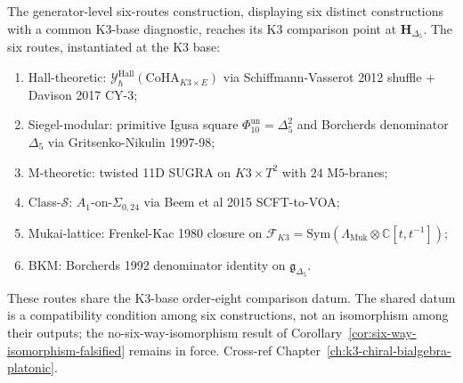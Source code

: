 \begin{remark}
\label{rem:cyc-sixroutes-generator-synthesis}
The generator-level six-routes construction, displaying six
distinct constructions with a common K3-base diagnostic, reaches
its K3 comparison point at $\mathbf H_{\Delta_5}$. The six routes,
instantiated at the K3 base:
\begin{enumerate}
\item Hall-theoretic: $\mathcal Y^{\mathrm{Hall}}_\hbar(\mathrm{CoHA}_{K3\times E})$
 via Schiffmann-Vasserot 2012 shuffle + Davison 2017 CY-$3$;
\item Siegel-modular: primitive Igusa square $\Phi_{10}^{\mathrm{un}}=\Delta_5^2$ and Borcherds denominator $\Delta_5$ via Gritsenko-Nikulin 1997-98;
\item M-theoretic: twisted 11D SUGRA on $K3\times T^2$ with $24$ M$5$-branes;
\item Class-$\mathcal S$: $A_1$-on-$\Sigma_{0,24}$ via Beem et al 2015
 SCFT-to-VOA;
\item Mukai-lattice: Frenkel-Kac 1980 closure on $\mathcal F_{K3} = \mathrm{Sym}(\Lambda_{\mathrm{Muk}}\otimes\mathbb C[t,t^{-1}])$;
\item BKM: Borcherds 1992 denominator identity on $\mathfrak g_{\Delta_5}$.
\end{enumerate}
These routes share the K3-base order-eight comparison datum.
The shared datum is a compatibility condition among six constructions,
not an isomorphism among their outputs; the no-six-way-isomorphism
result of Corollary~\ref{cor:six-way-isomorphism-falsified} remains in
force.
Cross-ref Chapter~\ref{ch:k3-chiral-bialgebra-platonic}.
\end{remark}

